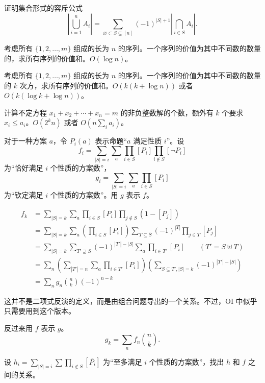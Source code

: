 \begin{example}
    证明集合形式的容斥公式
    $$
    \left|\bigcup_{i=1}^n A_i\right|=\sum_{\varnothing \subset S\subseteq [n]}(-1)^{|S|+1}\left|\bigcap_{i\in S}A_i\right|.
    $$
\end{example}

\begin{example}
    考虑所有 $\{1,2,\ldots,m\}$ 组成的长为 $n$ 的序列。一个序列的价值为其中不同数的数量的，求所有序列的价值和。$O(\log n)$。
\end{example}
\begin{exercise}
    考虑所有 $\{1,2,\ldots,m\}$ 组成的长为 $n$ 的序列。一个序列的价值为其中不同数的数量的 $k$ 次方，求所有序列的价值和。$O(k(k+\log n))$ 或者 $O(k(\log k+\log n))$。
\end{exercise}

\begin{example}
    计算不定方程 $x_1+x_2+\cdots+x_n=m$ 的非负整数解的个数，额外有 $k$ 个要求 $x_i\le a_i$。$O(2^kn)$ 或者 $O(n\sum_i a_i)$。
\end{example}


\begin{example}[二项式反演]
    对于一种方案 $a$，令 $P_i(a)$ 表示命题“$a$ 满足性质 $i$”。设
    $$
    f_i=\sum_{|S|=i}\sum_a\prod_{i\in S}[P_i]\prod_{i\notin S}[\lnot P_i]
    $$
    为“恰好满足 $i$ 个性质的方案数”，
    $$
    g_i=\sum_{|S|=i}\sum_a\prod_{i\in S}[P_i]
    $$ 
    为“钦定满足 $i$ 个性质的方案数”。用 $g$ 表示 $f$。
\end{example}
\begin{solution}
    $$
    \begin{aligned}
    f_k&=\sum_{|S|=k}\sum_a \prod_{i\in S}[P_i]\prod_{j\notin S}(1-[P_j])\\
    &=\sum_{|S|=k}\sum_a\left(\prod_{i\in S}[P_i]\right)\sum_{T\subseteq \bar S}(-1)^{|T|}\prod_{j\in T}[P_j]\\
    &=\sum_{|S|=k}\sum_{T'\supseteq S}(-1)^{|T'|-|S|}\sum_a\prod_{i\in T'}[P_i]\qquad(T'=S\uplus T)\\
    &=\sum_{n}\left(\sum_{|T'|=n}\sum_a\prod_{i\in T'}[P_i]\right)\left(\sum_{S\subseteq T',|S|=k}(-1)^{|T'|-|S|}\right)\\
    &=\sum_n g_n\binom{n}{k}(-1)^{n-k}
    \end{aligned}
    $$
\end{solution}
\begin{remark}
    这并不是二项式反演的定义，而是由组合问题导出的一个关系。不过，OI 中似乎只需要用到这个版本。
\end{remark}
\begin{exercise}
    反过来用 $f$ 表示 $g$。
    $$
    g_k=\sum_n f_n\binom{n}{k}.
    $$
\end{exercise}
\begin{exercise}[另一个方向]
    设 $h_i=\sum_{|S|=i}\sum\prod_{i\notin S}[\overline{P_i}]$ 为“至多满足 $i$ 个性质的方案数”，找出 $h$ 和 $f$ 之间的关系。
\end{exercise}

